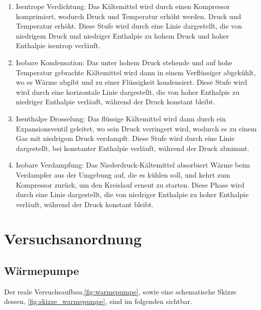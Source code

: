 \documentclass[12pt,english,ngerman]{scrartcl}
\begin{document}
\begin{enumerate}
	\item Isentrope Verdichtung: Das Kältemittel wird durch einen Kompressor komprimiert,
	      wodurch Druck und Temperatur erhöht werden. Druck und Temperatur erhöht. Diese
	      Stufe wird durch eine Linie dargestellt, die von niedrigem Druck und niedriger
	      Enthalpie zu hohem Druck und hoher Enthalpie isentrop verläuft.
	\item Isobare Kondensation: Das unter hohem Druck stehende und auf hohe Temperatur
	      gebrachte Kältemittel wird dann in einem Verflüssiger abgekühlt, wo es Wärme
	      abgibt und zu einer Flüssigkeit kondensiert. Diese Stufe wird wird durch eine
	      horizontale Linie dargestellt, die von hoher Enthalpie zu niedriger Enthalpie
	      verläuft, während der Druck konstant bleibt.
	\item Isenthalpe Drosselung: Das flüssige Kältemittel wird dann durch ein
	      Expansionsventil geleitet, wo sein Druck verringert wird, wodurch es zu einem
	      Gas mit niedrigem Druck verdampft. Diese Stufe wird durch eine Linie
	      dargestellt, bei konstanter Enthalpie verläuft, während der Druck abnimmt.
	\item Isobare Verdampfung: Das Niederdruck-Kältemittel absorbiert Wärme beim
	      Verdampfer aus der Umgebung auf, die es kühlen soll, und kehrt zum Kompressor
	      zurück, um den Kreislauf erneut zu starten. Diese Phase wird durch eine Linie
	      dargestellt, die von niedriger Enthalpie zu hoher Enthalpie verläuft, während
	      der Druck konstant bleibt.
\end{enumerate}

\section{Versuchsanordnung}\label{sec:versuchsanordnung}

\subsection{Wärmepumpe}

Der reale Versuchsaufbau,\autoref{fig:warmepumpe}, sowie eine schematische Skizze dessen,
\autoref{fig:skizze_warmepumpe}, sind im folgenden sichtbar.
\end{document}
